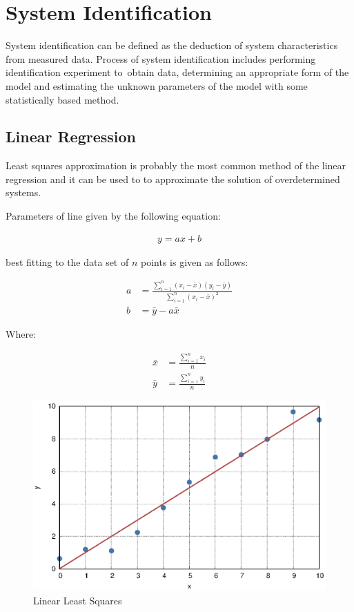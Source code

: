 \chapter{System Identification}

System identification can be defined as the deduction of system characteristics from measured data. \cite{NASA-RP-1138} Process of system identification includes performing identification experiment to obtain data, determining an appropriate form of the model and estimating the unknown parameters of the model with some statistically based method. \cite{SoderstromStoica1989}

\section{Linear Regression}

Least squares approximation is probably the most common method of the linear regression and it can be used to to approximate the solution of overdetermined systems.

Parameters of line given by the following equation:

\begin{align}
  y = ax + b
\end{align}

\clearpage

best fitting to the data set of $n$ points is given as follows:

\begin{align}
  a &= \frac{\sum_{i=1}^{n}{ \left( x_i - \bar{x} \right) \left( y_i - \bar{y} \right) }}{\sum_{i=1}^{n}{ \left( x_i - \bar{x} \right)^2 }} \\
  b &= \bar y - a \bar x
\end{align}

Where:

\begin{align}
  \bar{x} &= \frac{\sum_{i=1}^{n}{ x_i }}{ n } \\
  \bar{y} &= \frac{\sum_{i=1}^{n}{ y_i }}{ n }
\end{align}

\begin{figure}[h!]
  \centering
  \includegraphics[width=140mm]{eps/linear_least_squares.eps}
  \caption{Linear Least Squares}
\end{figure}
